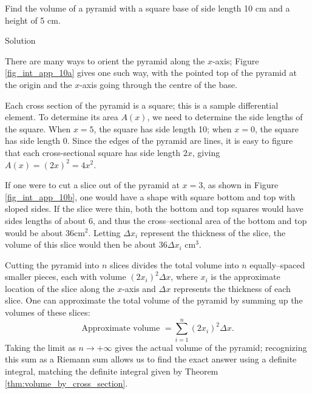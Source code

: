 \begin{example}\label{ex_disk0}
Find the volume of a pyramid with a square base of side length 10 cm and a height of 5 cm.

Solution 

There are many ways to orient the pyramid along the $x$-axis; Figure \ref{fig_int_app_10a} gives one such way, with the pointed top of the pyramid at the origin and the $x$-axis going through the centre of the base.


Each cross section of the pyramid is a square; this is a sample differential element. To determine its area $A(x)$, we need to determine the side lengths of the square.
When $x=5$, the square has side length 10; when $x=0$, the square has side length 0. Since the edges of the pyramid are lines, it is easy to figure that each cross-sectional square has side length $2x$, giving $A(x) = (2x)^2=4x^2$. %

If one were to cut a slice out of the pyramid at $x=3$, as shown in Figure \ref{fig_int_app_10b}, one would have a shape with square bottom and top with sloped sides. If the slice were thin, both the bottom and top squares would have sides lengths of about 6, and thus the cross--sectional area of the bottom and top would be about 36cm$^2$. Letting $\Delta x_i$ represent the thickness of the slice, the volume of this slice would then be about $36\Delta x_i$ cm$^3$. 

Cutting the pyramid into $n$ slices divides the total volume into $n$ equally--spaced smaller pieces, each with volume $(2x_i)^2\Delta x$, where $x_i$ is the approximate location of the slice along the $x$-axis and $\Delta x$ represents the thickness of each slice. One can approximate the total volume of the pyramid by summing up the volumes of these slices:
$$\text{Approximate volume } = \sum_{i=1}^n (2x_i)^2\Delta x.$$
Taking the limit as $n\to+\infty$ gives the actual volume of the pyramid; recognizing this sum as a Riemann sum allows us to find the exact answer using a definite integral, matching the definite integral given by Theorem \ref{thm:volume_by_cross_section}.


\end{example}

